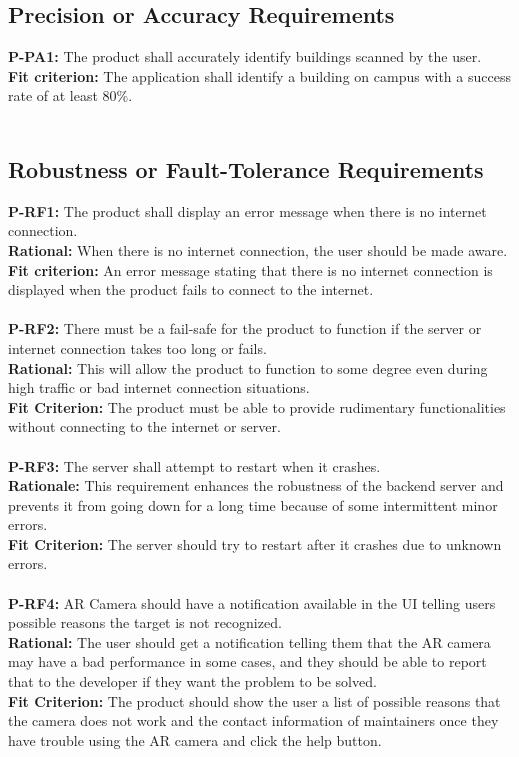\documentclass[12pt]{article}
\begin{document}
\subsection{Precision or Accuracy Requirements}
  \textbf{P-PA1:} The product shall accurately identify buildings scanned by the user.\\
  \textbf{Fit criterion:} The application shall identify a building on campus with a success rate of at least 80\%.\\\\
\subsection{Robustness or Fault-Tolerance Requirements}
  \textbf{P-RF1:} The product shall display an error message when there is no internet connection.\\
  \textbf{Rational:} When there is no internet connection, the user should be made aware.\\
  \textbf{Fit criterion:} An error message stating that there is no internet connection is displayed when the product fails to connect to the internet.\\\\
  \textbf{P-RF2:} There must be a fail-safe for the product to function if the server or internet connection takes too long or fails.\\
  \textbf{Rational:} This will allow the product to function to some degree even during high traffic or bad internet connection situations.\\
  \textbf{Fit Criterion:} The product must be able to provide rudimentary functionalities without connecting to the internet or server.\\\\
  \textbf{P-RF3:} The server shall attempt to restart when it crashes.\\
  \textbf{Rationale:} This requirement enhances the robustness of the backend server and prevents it from going down for a long time because of some intermittent minor errors.\\
  \textbf{Fit Criterion:} The server should try to restart after it crashes due to unknown errors.\\\\
  \textbf{P-RF4:} AR Camera should have a notification available in the UI telling users possible reasons the target is not recognized.\\
  \textbf{Rational:} The user should get a notification telling them that the AR camera may have a bad performance in some cases, and they should be able to report that to the developer if they want the problem to be solved.\\
  \textbf{Fit Criterion:} The product should show the user a list of possible reasons that the camera does not work and the contact information of maintainers once they have trouble using the AR camera and click the help button.\\\\
\end{document}
